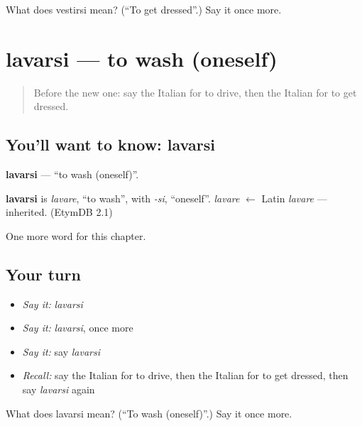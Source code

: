\begin{tcolorbox}[breakable,colback=teal!4,colframe=teal!35!black,title={Before you move on}]
What does vestirsi mean? (\textquotedblleft{}To get dressed\textquotedblright{}.) Say it once more.
\end{tcolorbox}
\section[lavarsi]{lavarsi — to wash (oneself)}

\label{lesson:IT-C134-lavarsi}



\begin{quote}
Before the new one: say the Italian for to drive, then the Italian for to get dressed.
\end{quote}

\subsection*{You'll want to know: lavarsi}
\textbf{lavarsi} — \textquotedblleft{}to wash (oneself)\textquotedblright{}.

\begin{cousinweb}
\textbf{lavarsi} is \emph{lavare}, \textquotedblleft{}to wash\textquotedblright{}, with \emph{-si}, \textquotedblleft{}oneself\textquotedblright{}. \emph{lavare} $\leftarrow$ Latin \emph{lavare} — inherited. (EtymDB 2.1)
\end{cousinweb}

\begin{grammarlens}[title={What you've built}]
One more word for this chapter.
\end{grammarlens}

\subsection*{Your turn}
\begin{itemize}
\raggedright
  \item \emph{Say it:} \emph{lavarsi}
  \item \emph{Say it:} \emph{lavarsi}, once more
  \item \emph{Say it:} say \emph{lavarsi}
  \item \emph{Recall:} say the Italian for to drive, then the Italian for to get dressed, then say \emph{lavarsi} again
\end{itemize}

\begin{tcolorbox}[breakable,colback=teal!4,colframe=teal!35!black,title={Before you move on}]
What does lavarsi mean? (\textquotedblleft{}To wash (oneself)\textquotedblright{}.) Say it once more.
\end{tcolorbox}
